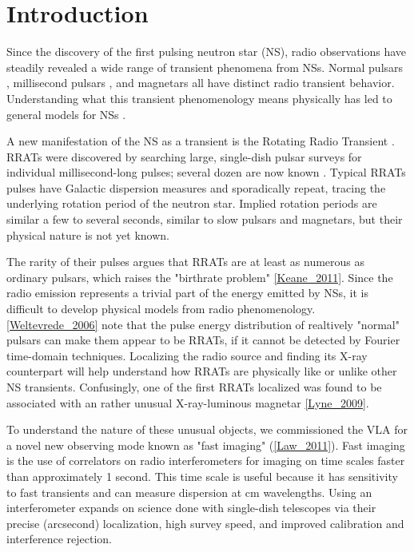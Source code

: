 \section{Introduction}

Since the discovery of the first pulsing neutron star (NS), radio observations have steadily revealed a wide range of transient phenomena from NSs. Normal pulsars \citep{HEWISH_1969}, millisecond pulsars \citep{Backer_1982}, and magnetars \citep{Camilo_2006} all have distinct radio transient behavior. Understanding what this transient phenomenology means physically has led to general models for NSs \citep{Perna_2011}.

A new manifestation of the NS as a transient is the Rotating Radio Transient \citep[RRAT;][]{McLaughlin_2006}. RRATs were discovered by searching large, single-dish pulsar surveys for individual millisecond-long pulses; several dozen are now known \citep[][\url{http://astro.phys.wvu.edu/rratalog}]{Deneva_2009, Burke_Spolaor_2010, Keane_2011}. Typical RRATs pulses have Galactic dispersion measures and sporadically repeat, tracing the underlying rotation period of the neutron star. Implied rotation periods are similar a few to several seconds, similar to slow pulsars and magnetars, but their physical nature is not yet known. 

The rarity of their pulses argues that RRATs are at least as numerous as ordinary pulsars, which raises the "birthrate problem" \ref{Keane_2011}. Since the radio emission represents a trivial part of the energy emitted by NSs, it is difficult to develop physical models from radio phenomenology. \ref{Weltevrede_2006} note that the pulse energy distribution of realtively "normal" pulsars can make them appear to be RRATs, if it cannot be detected by Fourier time-domain techniques. Localizing the radio source and finding its X-ray counterpart will help understand how RRATs are physically like or unlike other NS transients. Confusingly, one of the first RRATs localized was found to be associated with an rather unusual X-ray-luminous magnetar \ref{Lyne_2009}.

To understand the nature of these unusual objects, we commissioned the VLA for a novel new observing mode known as "fast imaging" (\ref{Law_2011}). Fast imaging is the use of correlators on radio interferometers for imaging on time scales faster than approximately 1 second. This time scale is useful because it has sensitivity to fast transients and can measure dispersion at cm wavelengths. Using an interferometer expands on science done with single-dish telescopes via their precise (arcsecond) localization, high survey speed, and improved calibration and interference rejection.

